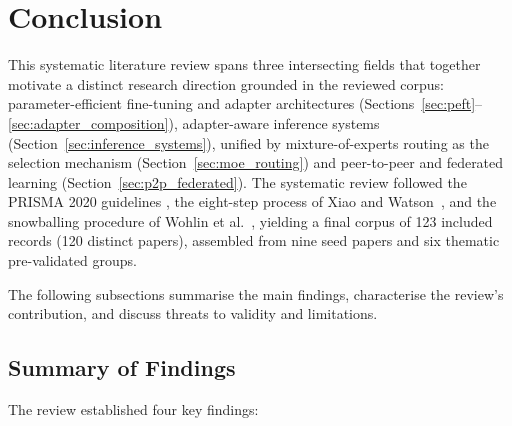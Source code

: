 \section{Conclusion}
\label{sec:conclusion}

This systematic literature review spans three intersecting fields
that together motivate a distinct research direction grounded in the reviewed
corpus: parameter-efficient fine-tuning
and adapter architectures (Sections~\ref{sec:peft}--\ref{sec:adapter_composition}),
adapter-aware inference systems (Section~\ref{sec:inference_systems}), unified by
mixture-of-experts routing as the selection mechanism (Section~\ref{sec:moe_routing}) and
peer-to-peer and federated learning (Section~\ref{sec:p2p_federated}).
The systematic review followed the PRISMA 2020 guidelines \cite{Page2021}, the
eight-step process of Xiao and Watson~\cite{XiaoWatson2019}, and the snowballing procedure of
Wohlin et al.~\cite{Wohlin2014}, yielding a final corpus of 123 included
records (120 distinct papers), assembled from nine seed papers and six
thematic pre-validated groups.

The following subsections summarise the main findings, characterise the review's contribution, and discuss threats to validity and limitations.

\subsection{Summary of Findings}
\label{sec:conclusion:summary}

The review established four key findings:

